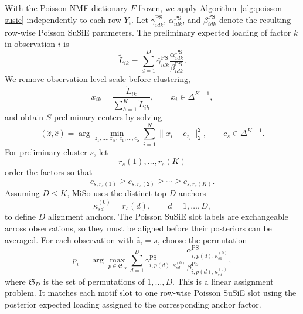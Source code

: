 \documentclass[11pt]{article}
\theoremstyle{plain}
\theoremstyle{definition}
\begin{document}
With the Poisson NMF dictionary $\widehat F$ frozen, we apply
Algorithm~\ref{alg:poisson-susie} independently to each row $Y_i$. Let
$\bar\gamma^{\mathrm{PS}}_{idk}$, $\alpha^{\mathrm{PS}}_{idk}$, and
$\beta^{\mathrm{PS}}_{idk}$ denote the resulting row-wise Poisson SuSiE
parameters. The preliminary expected loading of factor $k$ in observation $i$
is
\[
  \widetilde L_{ik}
  =
  \sum_{d=1}^D
  \bar\gamma^{\mathrm{PS}}_{idk}
  \frac{\alpha^{\mathrm{PS}}_{idk}}
       {\beta^{\mathrm{PS}}_{idk}}.
\]
We remove observation-level scale before clustering,
\[
  x_{ik}
  =
  \frac{\widetilde L_{ik}}
       {\sum_{h=1}^K\widetilde L_{ih}},
  \qquad x_i\in\Delta^{K-1},
\]
and obtain $S$ preliminary centers by solving
\[
  (\widehat z,\widehat c)
  =
  \arg\min_{z_1,\ldots,z_N,\,c_1,\ldots,c_S}
  \sum_{i=1}^N \lVert x_i-c_{z_i}\rVert_2^2,
  \qquad c_s\in\Delta^{K-1}.
\]
For preliminary cluster $s$, let
\[
  r_s(1),\ldots,r_s(K)
\]
order the factors so that
\[
  c_{s,r_s(1)}\geq c_{s,r_s(2)}\geq\cdots\geq c_{s,r_s(K)}.
\]
Assuming $D\leq K$, MiSo uses the distinct top-$D$ anchors
\begin{equation}
  \kappa_{sd}^{(0)}=r_s(d),
  \qquad d=1,\ldots,D,
  \label{eq:distinct-top-D-init}
\end{equation}
to define $D$ alignment anchors. The Poisson SuSiE slot labels are
exchangeable across observations, so they must be aligned before their
posteriors can be averaged. For each observation with $\widehat z_i=s$, choose
the permutation
\begin{equation}
  p_i
  =
  \arg\max_{p\in\mathfrak S_D}
  \sum_{d=1}^D
  \bar\gamma^{\mathrm{PS}}_{i,p(d),\kappa_{sd}^{(0)}}
  \frac{
    \alpha^{\mathrm{PS}}_{i,p(d),\kappa_{sd}^{(0)}}
  }{
    \beta^{\mathrm{PS}}_{i,p(d),\kappa_{sd}^{(0)}}
  },
  \label{eq:ps-slot-alignment}
\end{equation}
where $\mathfrak S_D$ is the set of permutations of $1,\ldots,D$. This is a
linear assignment problem. It matches each motif slot to one row-wise Poisson
SuSiE slot using the posterior expected loading assigned to the corresponding
anchor factor.
\end{document}
